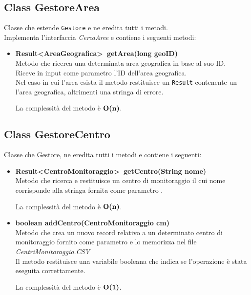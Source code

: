 \documentclass[a4paper, 12pt]{scrreprt}
\begin{document}
			\subsection{Class GestoreArea}
			Classe che estende \verb!Gestore! e ne eredita tutti i metodi.
			\\ Implementa l'interfaccia \textsl{CercaAree} e contiene i seguenti metodi:
			\begin{itemize}
				\item \textbf{Result\textless AreaGeografica\textgreater~getArea(long geoID)}
				\\Metodo che ricerca una determinata area geografica in base al suo ID.
				\\Riceve in input come parametro l'ID dell'area geografica.
				\\Nel caso in cui l'area esista il metodo restituisce un \verb!Result! contenente un l'area geografica, altrimenti una stringa di errore.
				
				La complessit\`a del metodo \`e $\mathbf{O}\textbf{(n)}$.
			\end{itemize}

			\subsection{Class GestoreCentro}
			Classe che Gestore, ne eredita tutti i metodi e contiene i seguenti:
			\begin{itemize}
				\item \textbf{Result\textless CentroMonitoraggio\textgreater~getCentro(String nome)}
				\\Metodo che ricerca e restituisce un centro di monitoraggio il cui nome corrisponde alla stringa fornita come parametro .
				
				La complessit\`a del metodo \`e $\mathbf{O}\textbf{(n)}$.
				
				\item \textbf {boolean addCentro(CentroMonitoraggio cm)}
				\\Metodo che crea un nuovo record relativo a un determinato centro di monitoraggio fornito come parametro e lo memorizza nel file \textsl{CentriMonitoraggio.CSV}
				\\Il metodo restituisce una variabile booleana che indica se l'operazione \`e stata eseguita correttamente.
				
				La complessit\`a del metodo \`e $\mathbf{O}\textbf{(1)}$.
			\end{itemize}
\end{document}
